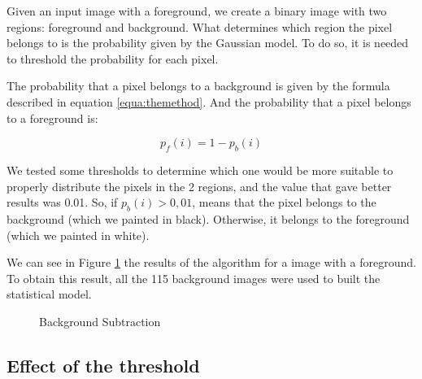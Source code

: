 \documentclass{article}
\begin{document}
	Given an input image with a foreground, we create a binary image with two regions: foreground and background. What determines which region the pixel belongs to is the probability given by the Gaussian model. To do so, it is needed to threshold the probability for each pixel.

	The probability that a pixel belongs to a background is given by the formula described in equation \ref{equa:themethod}. And the probability that a pixel belongs to a foreground is:

	\begin{equation}
	 p_f(i)=1-p_b(i)  
	\end{equation}

	We tested some thresholds to determine which one would be more suitable to properly distribute the pixels in the 2 regions, and the value that gave better results was 0.01. So, if {$p_b(i)>0,01$}, means that the pixel belongs to the background (which we painted in black). Otherwise, it belongs to the foreground (which we painted in white). 

	We can see in Figure \ref{fig:img_000053} the results of the algorithm for a image with a foreground. To obtain this result, all the 115 background images were used to built the statistical model.

	\begin{figure}[H]
		  \centering
		  \caption{Background Subtraction}
		  \label{fig:img_000053}
	\end{figure}

\subsection{Effect of the threshold}
\end{document}
